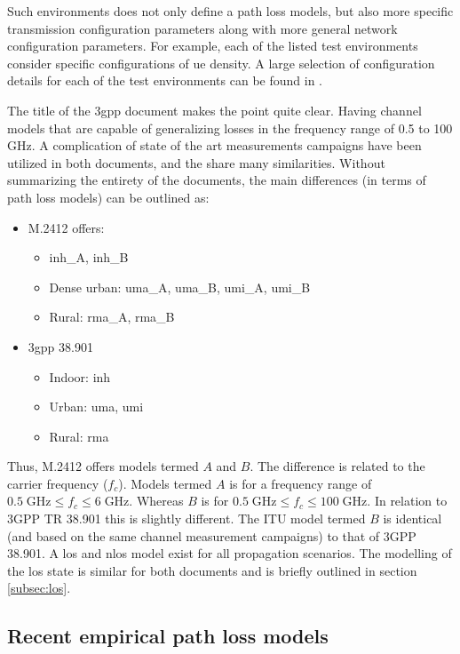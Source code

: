 Such environments does not only define a path loss models, but also more specific transmission configuration parameters along with more general network configuration parameters. For example, each of the listed test environments consider specific configurations of \gls{ue} density. A large selection of configuration details for each of the test environments can be found in \cite{ITU2412}.


The title of the \gls{3gpp} document makes the point quite clear. Having channel models that are capable of generalizing losses in the frequency range of 0.5 to 100 GHz. A complication of state of the art measurements campaigns have been utilized in both documents, and the share many similarities. Without summarizing the entirety of the documents, the main differences (in terms of path loss models) can be outlined as:

\begin{itemize}
\item M.2412 offers:
\begin{itemize}
\item \gls{inh}\_A, \gls{inh}\_B
\item Dense urban: \gls{uma}\_A, \gls{uma}\_B, \gls{umi}\_A, \gls{umi}\_B
\item Rural: \gls{rma}\_A, \gls{rma}\_B
\end{itemize}
\item \gls{3gpp} 38.901
\begin{itemize}
    \item Indoor: \gls{inh}
    \item Urban: \gls{uma}, \gls{umi}
    \item Rural: \gls{rma}
\end{itemize}
\end{itemize}

Thus, M.2412 offers models termed $A$ and $B$. The difference is related to the carrier frequency ($f_c$). Models termed $A$ is for a frequency range of $0.5\; \text{GHz} \leq f_c \leq 6 \;\text{GHz}$. Whereas $B$ is for $0.5 \; \text{GHz} \leq f_c \leq 100 \; \text{GHz}$. In relation to 3GPP TR 38.901 this is slightly different. The ITU model termed $B$ is identical (and based on the same channel measurement campaigns) to that of 3GPP 38.901. A \gls{los} and \gls{nlos} model exist for all propagation scenarios. The modelling of the \gls{los} state is similar for both documents and is briefly outlined in section \ref{subsec:los}.

\subsection{Recent empirical path loss models}

